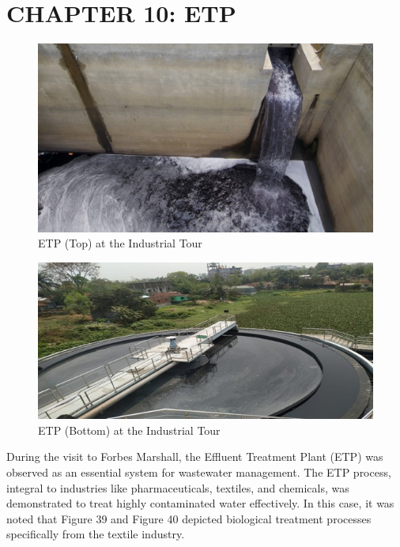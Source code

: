 \section{CHAPTER 10: ETP\cite{etp}}
 
\begin{figure}[h!]
    \centering
    \includegraphics[width=1\linewidth]{figs/etp.jpg}
    \caption{ETP (Top) at the Industrial Tour}
    \label{fig:etp}
\end{figure}

\begin{figure}[h!]
    \centering
    \includegraphics[width=1\linewidth]{figs/etp2.jpg}
    \caption{ETP (Bottom) at the Industrial Tour}
    \label{fig:etp2}
\end{figure}

During the visit to Forbes Marshall, the Effluent Treatment Plant (ETP) was observed as an essential system for wastewater management. The ETP process, integral to industries like pharmaceuticals, textiles, and chemicals, was demonstrated to treat highly contaminated water effectively. In this case, it was noted that Figure 39 and Figure 40 depicted biological treatment processes specifically from the textile industry.

